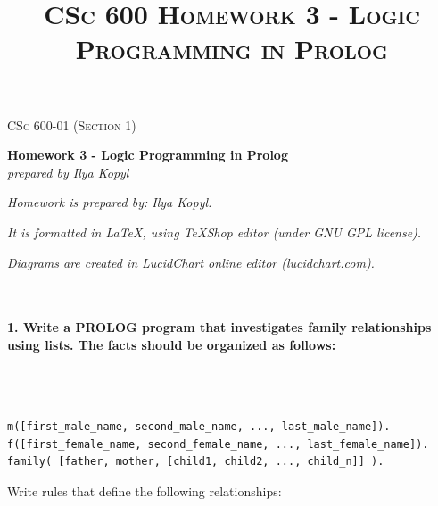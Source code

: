 \documentclass{article}
\begin{document}
	\setlength{\grammarparsep}{5pt plus 1pt minus 1pt} %
	\setlength{\grammarindent}{13em} %




	\begin{titlepage}
		\begin{center}
				\Large\textsc{CSc 600-01 (Section 1)}
				
				\Large\textbf{Homework 3 - Logic Programming in Prolog}\\

				\Large\textit{prepared by Ilya Kopyl}
				
		\end{center}	
	\end{titlepage}


	\title{\textsc{CSc 600 Homework 3 - Logic Programming in Prolog}}	
	\maketitle
	
		\textit{Homework is prepared by: Ilya Kopyl.}

		\textit{It is formatted in LaTeX, using TeXShop editor (under GNU GPL license).}
		
		\textit{Diagrams are created in LucidChart online editor (lucidchart.com).}

	\rmfamily\




	\paragraph{1. Write a PROLOG program that investigates family relationships using lists. The facts should be organized as follows:}\
	\rmfamily\\\
	
	\ttfamily
	\begin{verbatim} 
m([first_male_name, second_male_name, ..., last_male_name]).
f([first_female_name, second_female_name, ..., last_female_name]).
family( [father, mother, [child1, child2, ..., child_n]] ).
	\end{verbatim}
	
	\rmfamily
	Write rules that define the following relationships:
	
\end{document}
